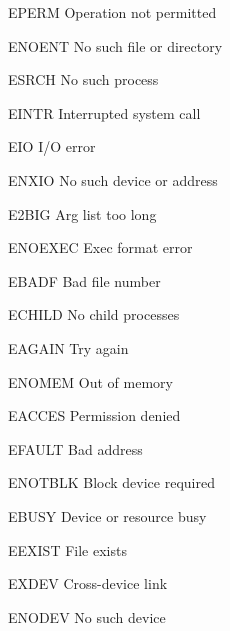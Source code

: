 \begin{datadesc}{EPERM} Operation not permitted \end{datadesc}
\begin{datadesc}{ENOENT} No such file or directory \end{datadesc}
\begin{datadesc}{ESRCH} No such process \end{datadesc}
\begin{datadesc}{EINTR} Interrupted system call \end{datadesc}
\begin{datadesc}{EIO} I/O error \end{datadesc}
\begin{datadesc}{ENXIO} No such device or address \end{datadesc}
\begin{datadesc}{E2BIG} Arg list too long \end{datadesc}
\begin{datadesc}{ENOEXEC} Exec format error \end{datadesc}
\begin{datadesc}{EBADF} Bad file number \end{datadesc}
\begin{datadesc}{ECHILD} No child processes \end{datadesc}
\begin{datadesc}{EAGAIN} Try again \end{datadesc}
\begin{datadesc}{ENOMEM} Out of memory \end{datadesc}
\begin{datadesc}{EACCES} Permission denied \end{datadesc}
\begin{datadesc}{EFAULT} Bad address \end{datadesc}
\begin{datadesc}{ENOTBLK} Block device required \end{datadesc}
\begin{datadesc}{EBUSY} Device or resource busy \end{datadesc}
\begin{datadesc}{EEXIST} File exists \end{datadesc}
\begin{datadesc}{EXDEV} Cross-device link \end{datadesc}
\begin{datadesc}{ENODEV} No such device \end{datadesc}
